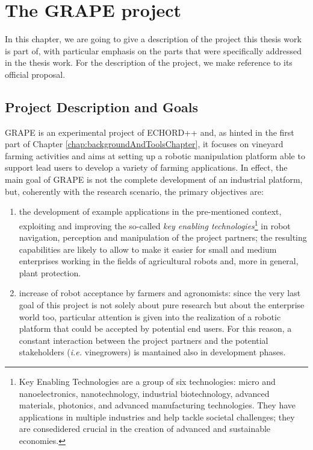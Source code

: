 \chapter{The GRAPE project} \label{chap:grapeProject}

In this chapter, we are going to give a description of the project this thesis work is part of, with particular emphasis on the parts that were specifically addressed in the thesis work. For the description of the project, we make reference to its official proposal.

\section{Project Description and Goals} \label{sec:grapeProjectDescription}
\ac{GRAPE} is an experimental project of \ac{ECHORD++} and, as hinted in the first part of Chapter \ref{chap:backgroundAndToolsChapter}, it focuses on vineyard farming activities and aims at setting up a robotic manipulation platform able to support lead users to develop a variety of farming applications.
 In effect, the main goal of \ac{GRAPE} is not the complete development of an industrial platform, but, coherently with the research scenario, the primary objectives are:
\begin{enumerate}
	\item the development of example applications in the pre-mentioned context, exploiting and improving the so-called \textit{key enabling technologies}\footnote{Key Enabling Technologies are a group of six technologies: micro and nanoelectronics, nanotechnology, industrial biotechnology, advanced materials, photonics, and advanced manufacturing technologies. They have applications in multiple industries and help tackle societal challenges; they are consedidered crucial in the creation of advanced and sustainable economies.} 
in robot navigation, perception and manipulation of the project partners; the resulting capabilities are likely to allow to make it easier for small and medium enterprises working in the fields of agricultural robots and, more in general, plant protection.
	\item increase of robot acceptance by farmers and agronomists: since the very last goal of this project is not solely about pure research but about the enterprise world too, particular attention is given into the realization of a robotic platform that could be accepted by potential end users. For this reason, a constant interaction between the project partners and the potential stakeholders (\textit{i.e.} vinegrowers) is mantained also in development phases.
\end{enumerate}

